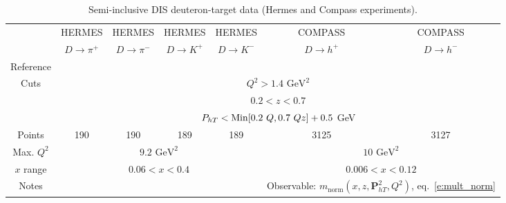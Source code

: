 \documentclass[aps,preprintnumbers,showpacs,nofootinbib,superscriptaddress,floatfix]{revtex4}
\newcommand{\Tperp}{T}
\begin{document}
\begin{table}[h!]
\begin{center}
\begin{tabular}{|c|c|c|c|c|c|c|}
 \hline
  & HERMES & HERMES & HERMES & HERMES & COMPASS & COMPASS\\
 ~          &  $D \to \pi^+$    &   $D \to \pi^-$    &  $D \to K^+$    &   $D \to K^-$      &  $D \to h^+$    &   $D \to h^-$            \\
 \hline
 Reference & \multicolumn{4}{c|}{\cite{Airapetian:2012ki}}        &\multicolumn{2}{c|}{\cite{Adolph:2013stb}} \\
\hline
\multirow{3}{*}{Cuts}             & \multicolumn{6}{c|}{$Q^2 > 1.4 \text{ GeV}^2$}     \\
             & \multicolumn{6}{c|}{$0.2 <z <0.7$}     \\
             & \multicolumn{6}{c|}{$P_{h \Tperp}< {\rm Min}[0.2\ Q, 0.7 \ Q z ] +0.5$ GeV}     \\
\hline
 Points         &  190 & 190 & 189 & 189   & 3125 & 3127   \\
 \hline
Max. $Q^2$      &  \multicolumn{4}{c|}{$9.2 \text{ GeV}^2 $}      & \multicolumn{2}{c|}{$10 \text{ GeV}^2 $}             \\
 \hline
$x$ range       & \multicolumn{4}{c|}{$0.06 < x < 0.4$ }    &  \multicolumn{2}{c|}{$0.006 < x < 0.12$ }             \\
\hline
Notes         &\multicolumn{4}{c|}{ }   & \multicolumn{2}{c|}{Observable: $\displaystyle m_{\text{norm}}(x,z,\bm{P}_{h\Tperp}^2, Q^2)$, eq.~\eqref{e:mult_norm}}  \\
\hline 
\end{tabular}
\caption{Semi-inclusive DIS deuteron-target data (Hermes and Compass experiments).}
\label{t:data_SIDIS_deuteron}
\end{center}
\end{table}
\end{document}
